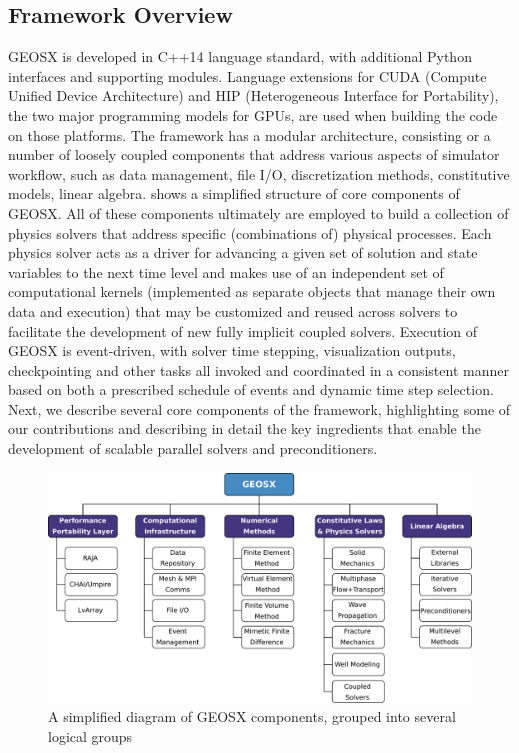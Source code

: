 \subsection{Framework Overview}
\label{subsec:geosx_overview}

GEOSX is developed in C++14 language standard, with additional Python interfaces and supporting modules.   Language extensions for CUDA (Compute Unified Device Architecture) and HIP (Heterogeneous Interface for Portability), the two major programming models for GPUs, are used when building the code on those platforms.   The framework has a modular architecture, consisting or a number of loosely coupled components that address various aspects of simulator workflow, such as data management, file I/O, discretization methods, constitutive models, linear algebra.    shows a simplified structure of core components of GEOSX.   All of these components ultimately are employed to build a collection of physics solvers that address specific (combinations of) physical processes.   Each physics solver acts as a driver for advancing a given set of solution and state variables to the next time level and makes use of an independent set of computational kernels (implemented as separate objects that manage their own data and execution) that may be customized and reused across solvers to facilitate the development of new fully implicit coupled solvers.   Execution of GEOSX is event-driven, with solver time stepping, visualization outputs, checkpointing and other tasks all invoked and coordinated in a consistent manner based on both a prescribed schedule of events and dynamic time step selection.   Next, we describe several core components of the framework, highlighting some of our contributions and describing in detail the key ingredients that enable the development of scalable parallel solvers and preconditioners.

\begin{figure} [htbp]
  \centerline{\includegraphics[width=0.9\linewidth]{figs/geosx}}
  \caption[Diagram of major GEOSX components]{\label{fig:geosx_components} A simplified diagram of GEOSX components, grouped into several logical groups}
\end{figure}

